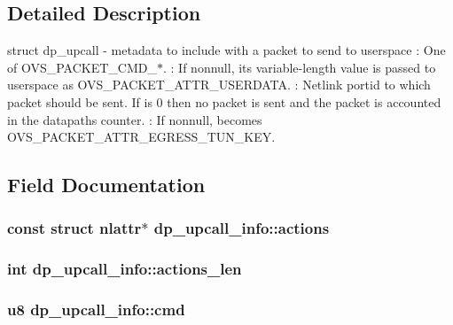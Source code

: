 \subsection{Detailed Description}
struct dp\+\_\+upcall -\/ metadata to include with a packet to send to userspace \+: One of O\+V\+S\+\_\+\+P\+A\+C\+K\+E\+T\+\_\+\+C\+M\+D\+\_\+$\ast$. \+: If nonnull, its variable-\/length value is passed to userspace as O\+V\+S\+\_\+\+P\+A\+C\+K\+E\+T\+\_\+\+A\+T\+T\+R\+\_\+\+U\+S\+E\+R\+D\+A\+T\+A. \+: Netlink portid to which packet should be sent. If  is 0 then no packet is sent and the packet is accounted in the datapath\textquotesingle{}s  counter. \+: If nonnull, becomes O\+V\+S\+\_\+\+P\+A\+C\+K\+E\+T\+\_\+\+A\+T\+T\+R\+\_\+\+E\+G\+R\+E\+S\+S\+\_\+\+T\+U\+N\+\_\+\+K\+E\+Y. 

\subsection{Field Documentation}
\hypertarget{structdp__upcall__info_a0e948e89cb162118d95c37d8c2a6c5c3}{}
\subsubsection[{actions}]{\setlength{\rightskip}{0pt plus 5cm}const struct nlattr$\ast$ dp\+\_\+upcall\+\_\+info\+::actions}\label{structdp__upcall__info_a0e948e89cb162118d95c37d8c2a6c5c3}
\hypertarget{structdp__upcall__info_ad5ccfb55799f138fa7d01461e2035d1f}{}
\subsubsection[{actions\+\_\+len}]{\setlength{\rightskip}{0pt plus 5cm}int dp\+\_\+upcall\+\_\+info\+::actions\+\_\+len}\label{structdp__upcall__info_ad5ccfb55799f138fa7d01461e2035d1f}
\hypertarget{structdp__upcall__info_afdbbbb0aef83ab4652e15715db247d22}{}
\subsubsection[{cmd}]{\setlength{\rightskip}{0pt plus 5cm}u8 dp\+\_\+upcall\+\_\+info\+::cmd}\label{structdp__upcall__info_afdbbbb0aef83ab4652e15715db247d22}
\hypertarget{structdp__upcall__info_a74a70c7b1f24487fd51d0f0c5aa1c11e}{}
